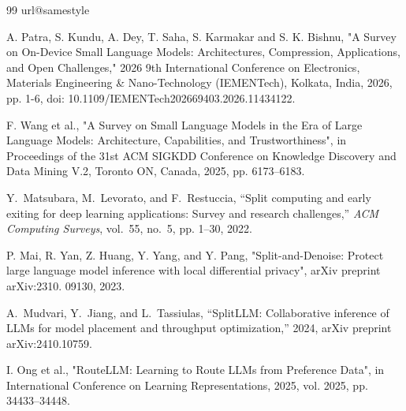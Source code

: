 \documentclass[lettersize,journal]{IEEEtran}
\begin{document}
\begin{thebibliography}{99}
\providecommand{\url}[1]{#1}
\csname url@samestyle\endcsname
\providecommand{\newblock}{\relax}
\providecommand{\bibinfo}[2]{#2}
\providecommand{\BIBentrySTDinterwordspacing}{\spaceskip=0pt\relax}
\providecommand{\BIBentryALTinterwordstretchfactor}{4}
\providecommand{\BIBentryALTinterwordspacing}{\spaceskip=\fontdimen2\font plus
\BIBentryALTinterwordstretchfactor\fontdimen3\font minus
  \fontdimen4\font\relax}
\providecommand{\BIBforeignlanguage}[2]{{%
\expandafter\ifx\csname l@#1\endcsname\relax
\typeout{** WARNING: IEEEtran.bst: No hyphenation pattern has been}%
\typeout{** loaded for the language `#1'. Using the pattern for}%
\typeout{** the default language instead.}%
\else
\language=\csname l@#1\endcsname
\fi
#2}}
\providecommand{\BIBdecl}{\relax}
\BIBdecl

A. Patra, S. Kundu, A. Dey, T. Saha, S. Karmakar and S. K. Bishnu, "A Survey on On-Device Small Language Models: Architectures, Compression, Applications, and Open Challenges," 2026 9th International Conference on Electronics, Materials Engineering \& Nano-Technology (IEMENTech), Kolkata, India, 2026, pp. 1-6, doi: 10.1109/IEMENTech202669403.2026.11434122.

F. Wang et al., "A Survey on Small Language Models in the Era of Large Language Models: Architecture, Capabilities, and Trustworthiness", in Proceedings of the 31st ACM SIGKDD Conference on Knowledge Discovery and Data Mining V.2, Toronto ON, Canada, 2025, pp. 6173–6183.

Y.~Matsubara, M.~Levorato, and F.~Restuccia, ``Split computing and early
  exiting for deep learning applications: Survey and research challenges,''
  \emph{ACM Computing Surveys}, vol.~55, no.~5, pp. 1--30, 2022.

P. Mai, R. Yan, Z. Huang, Y. Yang, and Y. Pang, "Split-and-Denoise: Protect large language model inference with local differential privacy", arXiv preprint arXiv:2310. 09130, 2023.

A.~Mudvari, Y.~Jiang, and L.~Tassiulas, ``{SplitLLM}: Collaborative inference of {LLMs} for model placement and throughput optimization,'' 2024, arXiv preprint arXiv:2410.10759.

I. Ong et al., "RouteLLM: Learning to Route LLMs from Preference Data", in International Conference on Learning Representations, 2025, vol. 2025, pp. 34433–34448.


\end{thebibliography}
\end{document}
